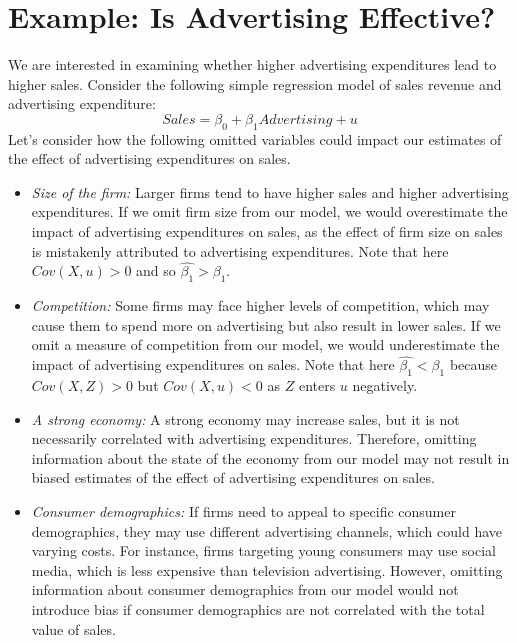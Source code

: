 \documentclass{./../../Latex/handout}
\begin{document}
\section*{Example: Is Advertising Effective?}
We are interested in examining whether higher advertising expenditures lead to higher sales. Consider the following simple regression model of sales revenue and advertising expenditure:
$$ Sales = \beta_0 + \beta_1 Advertising +u $$
Let's consider how the following omitted variables could impact our estimates of the effect of advertising expenditures on sales.
\begin{itemize}
\item \textit{Size of the firm:} Larger firms tend to have higher sales and higher advertising expenditures. If we omit firm size from our model, we would overestimate the impact of advertising expenditures on sales, as the effect of firm size on sales is mistakenly attributed to advertising expenditures. Note that here $Cov(X,u)>0$ and so $\hat{\beta_1}>\beta_1$.
\item \textit{Competition:} Some firms may face higher levels of competition, which may cause them to spend more on advertising but also result in lower sales. If we omit a measure of competition from our model, we would underestimate the impact of advertising expenditures on sales. Note that here $\hat{\beta_1}<\beta_1$ because $Cov(X,Z)>0$ but $Cov(X,u)<0$ as $Z$ enters $u$ negatively. 
\item \textit{A strong economy:} A strong economy may increase sales, but it is not necessarily correlated with advertising expenditures. Therefore, omitting information about the state of the economy from our model may not result in biased estimates of the effect of advertising expenditures on sales.
\item \textit{Consumer demographics:} If firms need to appeal to specific consumer demographics, they may use different advertising channels, which could have varying costs. For instance, firms targeting young consumers may use social media, which is less expensive than television advertising. However, omitting information about consumer demographics from our model would not introduce bias if consumer demographics are not correlated with the total value of sales.
\end{itemize}
\end{document}
